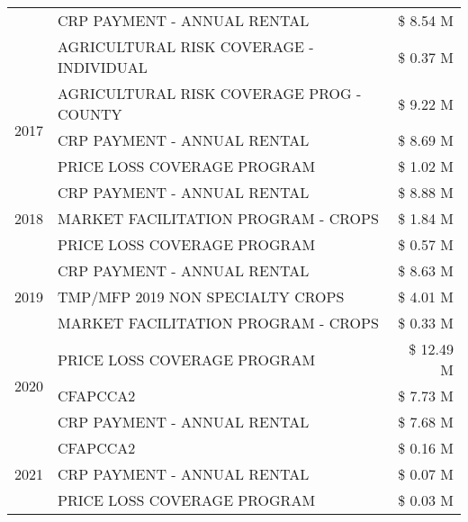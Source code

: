 \begin{tabular}{llr}
 & CRP PAYMENT - ANNUAL RENTAL & \$ 8.54 M \\
 & AGRICULTURAL RISK COVERAGE - INDIVIDUAL & \$ 0.37 M \\
\cline{1-3}
\multirow[t]{3}{*}{2017} & AGRICULTURAL RISK COVERAGE PROG - COUNTY & \$ 9.22 M \\
 & CRP PAYMENT - ANNUAL RENTAL & \$ 8.69 M \\
 & PRICE LOSS COVERAGE PROGRAM & \$ 1.02 M \\
\cline{1-3}
\multirow[t]{3}{*}{2018} & CRP PAYMENT - ANNUAL RENTAL & \$ 8.88 M \\
 & MARKET FACILITATION PROGRAM - CROPS & \$ 1.84 M \\
 & PRICE LOSS COVERAGE PROGRAM & \$ 0.57 M \\
\cline{1-3}
\multirow[t]{3}{*}{2019} & CRP PAYMENT - ANNUAL RENTAL & \$ 8.63 M \\
 & TMP/MFP 2019 NON SPECIALTY CROPS & \$ 4.01 M \\
 & MARKET FACILITATION PROGRAM - CROPS & \$ 0.33 M \\
\cline{1-3}
\multirow[t]{3}{*}{2020} & PRICE LOSS COVERAGE PROGRAM & \$ 12.49 M \\
 & CFAPCCA2 & \$ 7.73 M \\
 & CRP PAYMENT - ANNUAL RENTAL & \$ 7.68 M \\
\cline{1-3}
\multirow[t]{3}{*}{2021} & CFAPCCA2 & \$ 0.16 M \\
 & CRP PAYMENT - ANNUAL RENTAL & \$ 0.07 M \\
 & PRICE LOSS COVERAGE PROGRAM & \$ 0.03 M \\
\cline{1-3}
\bottomrule
\end{tabular}
